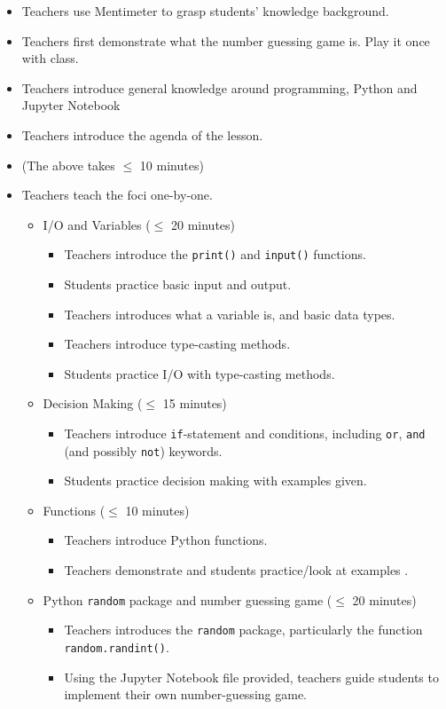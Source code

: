 \documentclass{article}
\def\T{Teachers }
\def\t{teachers }
\def\S{Students }
\def\s{students }
\begin{document}
\begin{itemize}
\item \T use Mentimeter to grasp students' knowledge background.

\item \T first demonstrate what the number guessing game is. Play it once with class.

\item \T introduce general knowledge around programming, Python and Jupyter Notebook

\item \T introduce the agenda of the lesson.

\item[] (The above takes $\leq$ 10 minutes)

\item \T teach the foci one-by-one.
	\begin{itemize}
		\item I/O and Variables ($\leq$ 20 minutes)
		\begin{itemize}
			\item \T introduce the \texttt{print()} and \texttt{input()} functions.
			\item \S practice basic input and output.
			\item \T introduces what a variable is, and basic data types.
			\item \T introduce type-casting methods.
			\item \S practice I/O with type-casting methods.
		\end{itemize}
		\item Decision Making ($\leq$ 15 minutes)
		\begin{itemize}
			\item \T introduce \texttt{if}-statement and conditions, including \texttt{or}, \texttt{and} (and possibly \texttt{not}) keywords.
			\item \S practice decision making with examples given.
		\end{itemize}
		\item Functions ($\leq$ 10 minutes)
		\begin{itemize}
			\item \T introduce Python functions.
			\item \T demonstrate and \s practice/look at examples .
		\end{itemize}
		\item Python \texttt{random} package and number guessing game ($\leq$ 20 minutes)
		\begin{itemize}
			\item \T introduces the \texttt{random} package, particularly the function \texttt{random.randint()}.
			\item Using the Jupyter Notebook file provided, \t guide \s to implement their own number-guessing game.
		\end{itemize}
	\end{itemize}


\end{itemize}
\end{document}
